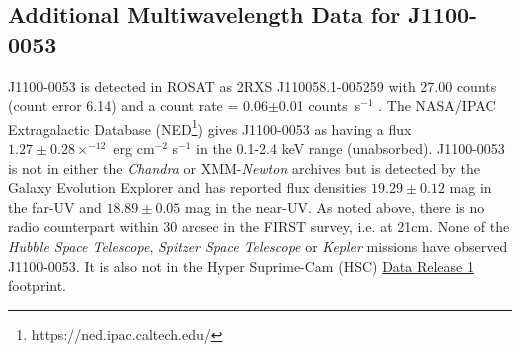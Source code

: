 \documentclass[a4paper,fleqn,usenatbib]{mnras}
\begin{document}
\subsection{Additional Multiwavelength Data for J1100-0053}
J1100-0053 is detected in ROSAT as 2RXS J110058.1-005259 with 27.00
counts (count error 6.14) and a count rate = 0.06$\pm$0.01
counts~s$^{-1}$ \citep{Boller2016}. The NASA/IPAC Extragalactic
Database (NED\footnote{https://ned.ipac.caltech.edu/}) gives
J1100-0053 as having a flux $1.27\pm0.28 \times^{-12}$ erg cm$^{-2}$ s$^{-1}$ in the
0.1-2.4 keV range (unabsorbed). J1100-0053 is not in either the
{\it Chandra} or XMM-{\it Newton} archives but is detected by the
Galaxy Evolution Explorer \citep[GALEX; ][]{Martin2005, Morrissey2007}
and has reported flux densities $19.29\pm0.12$ mag in the far-UV and $18.89\pm0.05$
mag in the near-UV. As noted above, there is no radio counterpart within 30
arcsec in the FIRST survey, i.e. at 21cm. None of 
the {\it Hubble Space Telescope}, {\it Spitzer Space Telescope} or
{\it Kepler} missions have observed J1100-0053.  It is also not in
the Hyper Suprime-Cam (HSC)
\href{https://hsc-release.mtk.nao.ac.jp/doc/}{Data Release 1}
\citep{Aihara2017} footprint.
\end{document}
